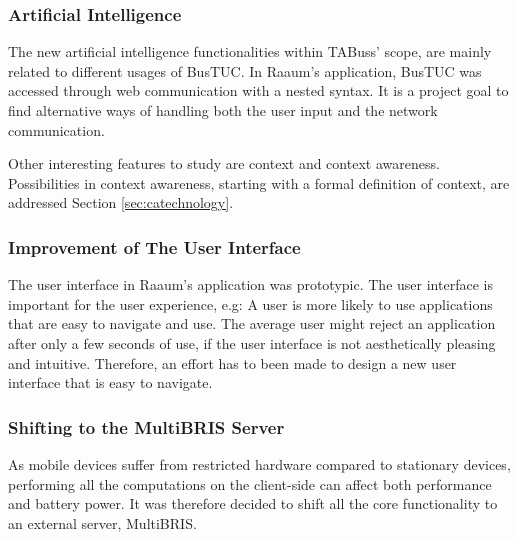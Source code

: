 \subsubsection{Artificial Intelligence}
The new artificial intelligence functionalities within TABuss' scope, are mainly related to different usages of BusTUC. In Raaum's application, BusTUC was accessed through web communication with a nested syntax. It is a project goal to find alternative ways of handling both the user input and the network communication. 

Other interesting features to study are context and context awareness. Possibilities in context awareness, starting with a formal definition of  context, are addressed Section \ref{sec:catechnology}.

\subsubsection{Improvement of The User Interface}
The user interface in Raaum's application was prototypic. The user interface is important for the user experience, e.g: A user is more likely to use applications that are easy to navigate and use. The average user might reject an application after only a few seconds of use, if the user interface is not aesthetically pleasing and intuitive. Therefore, an effort has to been made to design a new user interface that is easy to navigate.

\subsubsection{Shifting to the MultiBRIS Server}
As mobile devices suffer from restricted hardware compared to stationary devices, performing all the computations on the client-side can affect both performance and battery power. It was therefore decided to shift all the core functionality to an external server, MultiBRIS\cite{multibris}.





